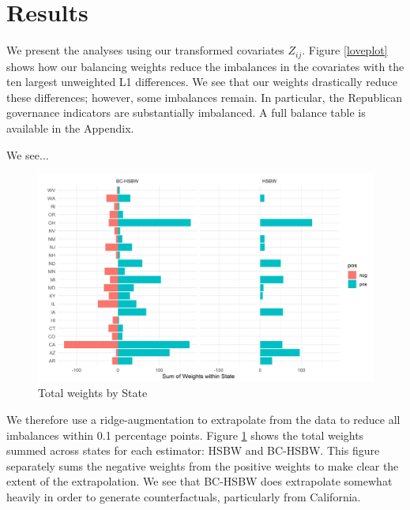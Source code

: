 \documentclass[12pt]{article}
\begin{document}
\section{Results}

We present the analyses using our transformed covariates $Z_{ij}$. Figure \ref{loveplot} shows how our balancing weights reduce the imbalances in the covariates with the ten largest unweighted L1 differences. We see that our weights drastically reduce these differences; however, some imbalances remain. In particular, the Republican governance indicators are substantially imbalanced. A full balance table is available in the Appendix. 

We see...

\begin{figure}[B]
\begin{center}
    \includegraphics[scale=0.6]{01_Plots/weights-by-state-main.png}
    \caption{Total weights by State}
    \label{statewghts}
\end{center}
\end{figure}

We therefore use a ridge-augmentation to extrapolate from the data to reduce all imbalances within 0.1 percentage points. Figure \ref{statewghts} shows the total weights summed across states for each estimator: HSBW and BC-HSBW. This figure separately sums the negative weights from the positive weights to make clear the extent of the extrapolation. We see that BC-HSBW does extrapolate somewhat heavily in order to generate counterfactuals, particularly from California. 
\end{document}
